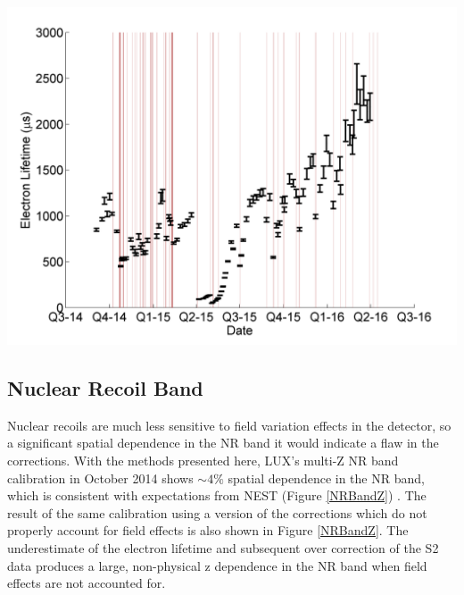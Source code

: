 \begin{center}
\includegraphics[scale=0.4]{Run04Corrections/LUX_eLifetime_Kr2p22.png}
 \label{fig:KrypCalLifetime}
\end{center}

\subsection{Nuclear Recoil Band}

Nuclear recoils are much less sensitive to field variation effects in the detector, so a significant spatial dependence in the NR band it would indicate a flaw in the corrections. With the methods presented here, LUX's multi-Z NR band calibration in October 2014 shows $\sim4\%$ spatial dependence in the NR band, which is consistent with expectations from NEST (Figure \ref{NRBandZ}) . The result of the same calibration using a version of the corrections which do not properly account for field effects is also shown in Figure \ref{NRBandZ}.  The underestimate of the electron lifetime and subsequent over correction of the S2 data produces a large, non-physical z dependence in the NR band when field effects are not accounted for.  

